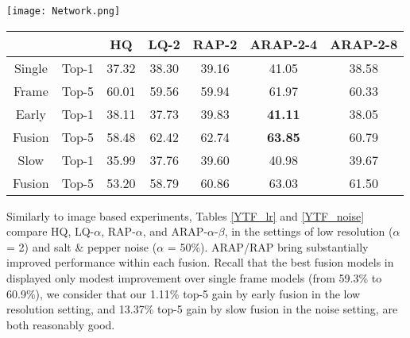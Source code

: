 \documentclass[10pt,twocolumn,twoside]{IEEEtran} %
\begin{document}
\begin{figure*}[htbp]
	\centering
			\texttt{[image: Network.png]}
	\caption{Model architectures for YTF video recognition experiments. Top: early fusion. Bottom: slow fusion.}
	\label{fig:video_net}
\end{figure*}\begin{table*}[t]
	\fontsize{10pt}{12pt}\selectfont
	\caption{The top-1 and top-5 accuracy (\%) on YTF, in the low resolution setting, with different fusion strategies.}
	\begin{center}
		\begin{tabular}{c|c|c|c|c|c|c}
			\hline
			& & HQ & LQ-2 & RAP-2 & ARAP-2-4 & ARAP-2-8 \\ \hline
			\hline
			Single  & Top-1 & 37.32 & 38.30 & 39.16 & 41.05 & 38.58 \\
			Frame & Top-5 & 60.01 & 59.56 & 59.94 & 61.97 & 60.33 \\ 
			\hline
			\hline
			Early  & Top-1 & 38.11 & 37.73 & 39.83 & \textbf{41.11} & 38.05 \\
			Fusion & Top-5 & 58.48 & 62.42 & 62.74 & \textbf{63.85} & 60.79 \\ 
			\hline
			\hline
			Slow  & Top-1 & 35.99 & 37.76 & 39.60 & 40.98 & 39.67\\
			Fusion & Top-5 & 53.20 & 58.79 & 60.86 & 63.03 & 61.50 \\ 
			\hline
		\end{tabular}
	\end{center}
	
	\label{YTF_lr}
\end{table*}

Similarly to image based experiments, Tables \ref{YTF_lr} and \ref{YTF_noise} compare HQ, LQ-$\alpha$, RAP-$\alpha$, and ARAP-$\alpha$-$\beta$, in the settings of low resolution ($\alpha$ = 2) and salt \& pepper noise ($\alpha$ = 50\%). ARAP/RAP bring substantially improved performance within each fusion. Recall that the best fusion models in \cite{karpathy2014large} displayed only modest improvement over single frame models (from 59.3\% to 60.9\%), we consider that our 1.11\% top-5 gain by early fusion in the low resolution setting, and 13.37\% top-5 gain by slow fusion in the noise setting, are both reasonably good. 
\end{document}
